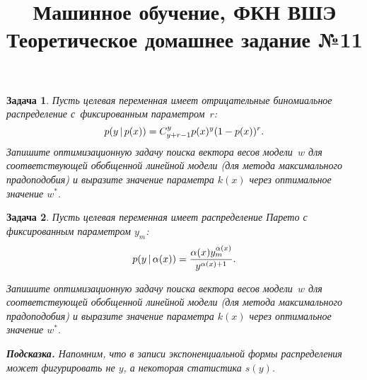 \documentclass[12pt,fleqn]{article}
\title{Машинное обучение, ФКН ВШЭ\\Теоретическое домашнее задание №11}
\author{}
\date{}
\newtheorem{esProblem}{Задача}
\begin{document}
\maketitle

\begin{esProblem}
	Пусть целевая переменная имеет отрицательные биномиальное распределение с~фиксированным параметром~$r$:
	$$p(y \mspace{3mu}{|}\mspace{3mu} p(x)) = C_{y + r - 1}^y p(x)^y (1-p(x))^r.$$
	Запишите оптимизационную задачу поиска вектора весов модели~$w$ для соответствующей обобщенной линейной модели (для метода максимального прадоподобия) и выразите значение параметра $k(x)$ через оптимальное значение $w^*.$
\end{esProblem}

\begin{esProblem}
	Пусть целевая переменная имеет распределение Парето с фиксированным параметром $y_m$:
	$$p(y \mspace{3mu}{|}\mspace{3mu} \alpha(x)) = \frac{\alpha(x) y_m^{\alpha(x)}}{y^{\alpha(x) + 1}}.$$
	
	Запишите оптимизационную задачу поиска вектора весов модели~$w$ для соответствующей обобщенной линейной модели (для метода максимального прадоподобия) и выразите значение параметра $k(x)$ через оптимальное значение $w^*.$
	
	\textbf{Подсказка.} Напомним, что в записи экспоненциальной формы распределения может фигурировать не $y$, а некоторая статистика $s(y)$.
\end{esProblem}
\end{document}
